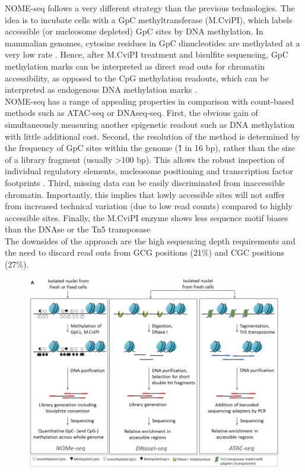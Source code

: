 NOME-seq follows a very different strategy than the previous technologies. The idea is to incubate cells with a GpC methyltransferase (M.CviPI), which labels accessible (or nucleosome depleted) GpC sites by DNA methylation. In mammalian genomes, cytosine residues in GpC dinucleotides are methylated at a very low rate \cite{Kilgore2007}. Hence, after M.CviPI treatment and bisulfite sequencing, GpC methylation marks can be interpreted as direct read outs for chromatin accessibility, as opposed to the CpG methylation readouts, which can be interpreted as endogenous DNA methylation marks \cite{Kelly2012}.\\
NOME-seq has a range of appealing properties in comparison with count-based methods such as ATAC-seq or DNAseq-seq. First, the obvious gain of simultaneously measuring another epigenetic readout such as DNA methylation with little additional cost. Second, the resolution of the method is determined by the frequency of GpC sites within the genome (\~1 in 16 bp), rather than the size of a library fragment (usually >100 bp). This allows the robust inspection of individual regulatory elements, nucleosome positioning and transcription factor footprints \cite{Kelly2012,Pott2016,Nordstrom2019}. Third, missing data can be easily discriminated from inaccessible chromatin. Importantly, this implies that lowly accessible sites will not suffer from increased technical variation (due to low read counts) compared to highly accessible sites. Finally, the M.CviPI enzyme shows less sequence motif biases than the DNAse or the Tn5 transposase \cite{Nordstrom2019}\\ 
The downsides of the approach are the high sequencing depth requirements and the need to discard read outs from GCG positions (21\%) and CGC positions (27\%).

\begin{figure}[H]
	\centering
	\includegraphics[width=1.0\linewidth]{ChromatinAcc_protocols}
	\caption[XXX]{}
	\label{fig:ChromatinAcc_protocols}
\end{figure}

